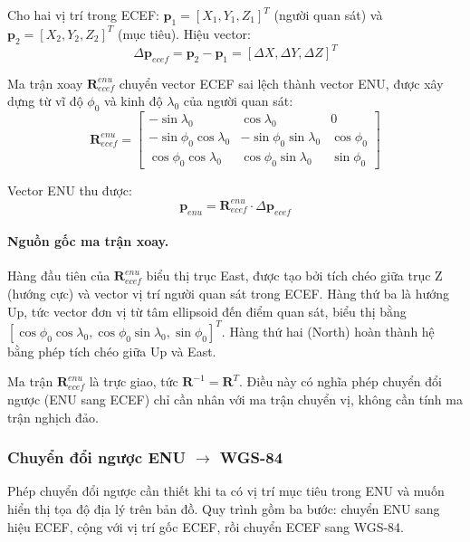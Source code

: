 Cho hai vị trí trong ECEF: $\mathbf{p}_1 = [X_1, Y_1, Z_1]^T$ (người quan sát) và $\mathbf{p}_2 = [X_2, Y_2, Z_2]^T$ (mục tiêu). Hiệu vector:
\begin{equation}
    \Delta\mathbf{p}_{ecef} = \mathbf{p}_2 - \mathbf{p}_1 = [\Delta X, \Delta Y, \Delta Z]^T
\end{equation}

Ma trận xoay $\mathbf{R}_{ecef}^{enu}$ chuyển vector ECEF sai lệch thành vector ENU, được xây dựng từ vĩ độ $\phi_0$ và kinh độ $\lambda_0$ của người quan sát:
\begin{equation}
    \mathbf{R}_{ecef}^{enu} = \begin{bmatrix}
        -\sin\lambda_0 & \cos\lambda_0 & 0 \\
        -\sin\phi_0\cos\lambda_0 & -\sin\phi_0\sin\lambda_0 & \cos\phi_0 \\
        \cos\phi_0\cos\lambda_0 & \cos\phi_0\sin\lambda_0 & \sin\phi_0
    \end{bmatrix}
\end{equation}

Vector ENU thu được:
\begin{equation}
    \mathbf{p}_{enu} = \mathbf{R}_{ecef}^{enu} \cdot \Delta\mathbf{p}_{ecef}
\end{equation}

\paragraph{Nguồn gốc ma trận xoay.\\} Hàng đầu tiên của $\mathbf{R}_{ecef}^{enu}$ biểu thị trục East, được tạo bởi tích chéo giữa trục Z (hướng cực) và vector vị trí người quan sát trong ECEF. Hàng thứ ba là hướng Up, tức vector đơn vị từ tâm ellipsoid đến điểm quan sát, biểu thị bằng $[\cos\phi_0\cos\lambda_0, \cos\phi_0\sin\lambda_0, \sin\phi_0]^T$. Hàng thứ hai (North) hoàn thành hệ bằng phép tích chéo giữa Up và East.

Ma trận $\mathbf{R}_{ecef}^{enu}$ là trực giao, tức $\mathbf{R}^{-1} = \mathbf{R}^T$. Điều này có nghĩa phép chuyển đổi ngược (ENU sang ECEF) chỉ cần nhân với ma trận chuyển vị, không cần tính ma trận nghịch đảo.

\subsubsection{Chuyển đổi ngược ENU \texorpdfstring{$\rightarrow$}{sang} WGS-84}

\hspace{0.5cm} Phép chuyển đổi ngược cần thiết khi ta có vị trí mục tiêu trong ENU và muốn hiển thị tọa độ địa lý trên bản đồ. Quy trình gồm ba bước: chuyển ENU sang hiệu ECEF, cộng với vị trí gốc ECEF, rồi chuyển ECEF sang WGS-84.

